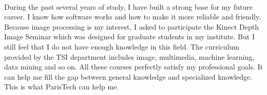 \documentclass[a4paper]{article}
\begin{document}
\paragraph{}   
During the past several years of study, I have built a strong base for my future career. I know how software works and how to make it more reliable and friendly. Because image processing is my interest, I asked to participate the Kinect Depth Image Seminar which was designed for graduate students in my institute. But I still feel that I do not have enough knowledge in this field. The curriculum provided by the TSI department includes image, multimedia, machine learning, data mining and so on. All these courses perfectly satisfy my professional goals. It can help me fill the gap between general knowledge and specialized knowledge. This is what ParisTech can help me.
\end{document}
